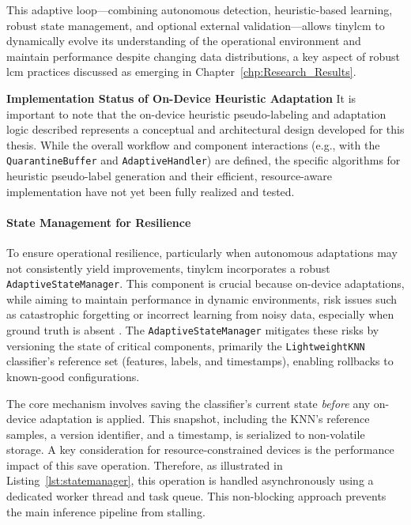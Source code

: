 This adaptive loop—combining autonomous detection, heuristic-based learning, robust state management, and optional external validation—allows \gls{tinylcm} to dynamically evolve its understanding of the operational environment and maintain performance despite changing data distributions, a key aspect of robust \gls{lcm} practices discussed as emerging in Chapter~\ref{chp:Research_Results}.

\begin{MyBox}{\textbf{Implementation Status of On-Device Heuristic Adaptation}}
    It is important to note that the on-device heuristic pseudo-labeling and adaptation logic described represents a conceptual and architectural design developed for this thesis. While the overall workflow and component interactions (e.g., with the \texttt{QuarantineBuffer} and \texttt{AdaptiveHandler}) are defined, the specific algorithms for heuristic pseudo-label generation and their efficient, resource-aware implementation have not yet been fully realized and tested.
\end{MyBox}

\paragraph{State Management for Resilience}
To ensure operational resilience, particularly when autonomous adaptations may not consistently yield improvements, \gls{tinylcm} incorporates a robust \texttt{AdaptiveStateManager}. This component is crucial because on-device adaptations, while aiming to maintain performance in dynamic environments, risk issues such as catastrophic forgetting or incorrect learning from noisy data, especially when ground truth is absent \cite{renOndeviceOnlineLearning2024, pavanTyBoxAutomaticDesign2024}. The \texttt{AdaptiveStateManager} mitigates these risks by versioning the state of critical components, primarily the \texttt{LightweightKNN} classifier's reference set (features, labels, and timestamps), enabling rollbacks to known-good configurations.

The core mechanism involves saving the classifier's current state \textit{before} any on-device adaptation is applied. This snapshot, including the KNN's reference samples, a version identifier, and a timestamp, is serialized to non-volatile storage. A key consideration for resource-constrained devices is the performance impact of this save operation. Therefore, as illustrated in Listing~\ref{lst:statemanager}, this operation is handled asynchronously using a dedicated worker thread and task queue. This non-blocking approach prevents the main inference pipeline from stalling.

